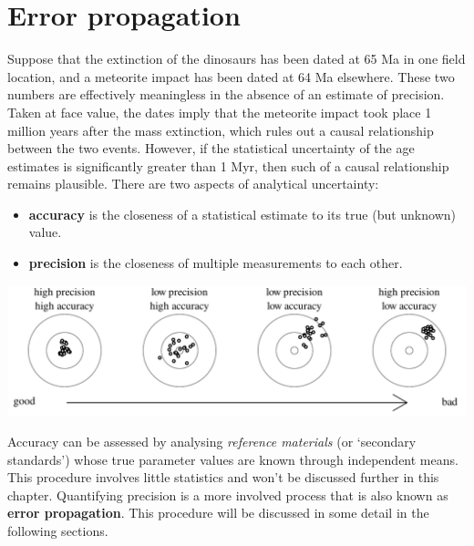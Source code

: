 \chapter{Error propagation}
\label{ch:errorprop}

Suppose that the extinction of the dinosaurs has been dated at 65 Ma
in one field location, and a meteorite impact has been dated at 64 Ma
elsewhere.  These two numbers are effectively meaningless in the
absence of an estimate of precision. Taken at face value, the dates
imply that the meteorite impact took place 1 million years after the
mass extinction, which rules out a causal relationship between the two
events. However, if the statistical uncertainty of the age estimates
is significantly greater than 1 Myr, then such of a causal
relationship remains plausible. There are two aspects of analytical
uncertainty:

\begin{itemize}
  \item{\bf accuracy} is the closeness of a statistical estimate to
    its true (but unknown) value.
  \item{\bf precision} is the closeness of multiple measurements to
    each other.
\end{itemize}

\noindent\includegraphics[width=\textwidth]{../figures/accuracyvsprecision.pdf}
\begingroup {}
\label{fig:darts}
\endgroup

Accuracy can be assessed by analysing \emph{reference materials} (or
`secondary standards') whose true parameter values are known through
independent means. This procedure involves little statistics and won't
be discussed further in this chapter. Quantifying precision is a more
involved process that is also known as \textbf{error
  propagation}. This procedure will be discussed in some detail in the
following sections.

